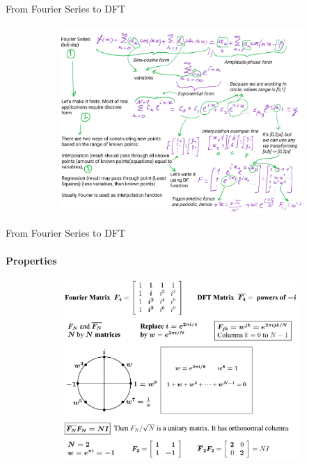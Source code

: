 \documentclass[aspectratio=169]{beamer}
\newcommand{\fbckg}[1]{\usebackgroundtemplate{\texttt{[image: \#1]}}}%
\begin{document}
\begin{frame}[t]{From Fourier Series to DFT}
\framesubtitle{}
\vspace{-0.75cm}
\begin{figure}[H]
    \centering\includegraphics[height=7cm,width=1\textwidth,keepaspectratio]{AGLA2_for_slides_9.png}
    \label{fig:AGLA2_for_slides_9.png}
\end{figure}
\end{frame}

\usebackgroundtemplate{}

\fbckg{fibeamer/figs/common.png}

\begin{frame}[t]{From Fourier Series to DFT}
    \framesubtitle{Properties}
    \vspace{-1.2cm}
    \begin{figure}[H]
        \centering\includegraphics[height=6.8cm,width=1\textwidth,keepaspectratio]{DFT.png}
        \label{fig:DFT.png}
    \end{figure}
    \end{frame}
\end{document}

